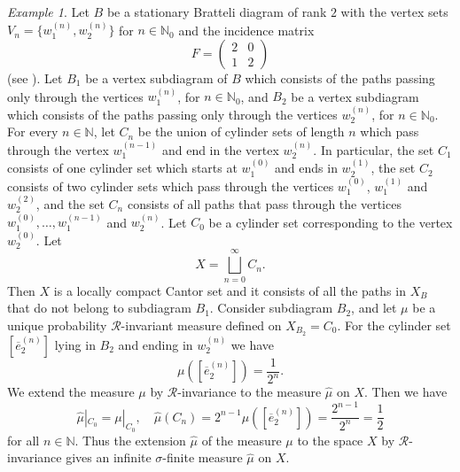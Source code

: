 \documentclass[11pt,reqno]{amsart}
\theoremstyle{definition}
\theoremstyle{remark}
\newtheorem{example}[definition]{Example}
\theoremstyle{plain}
\def\ov{\overline}
\def\wh{\widehat}
\newcommand{\N}{\mathbb N}
\numberwithin{equation}{section}
\begin{document}
\begin{example}\label{example_measure_convergence_BD_inf} Let $B$ be a stationary Bratteli diagram of rank $2$ with the vertex sets $V_n = \{w_1^{(n)}, w_2^{(n)}\}$ for $n \in \N_0$ and the incidence matrix
$$
F = \begin{pmatrix}
2 & 0\\
1 & 2
\end{pmatrix}
$$
(see ). Let $B_1$ be a vertex subdiagram of $B$ which consists of the paths passing only through the vertices $w_1^{(n)}$, for $n \in \N_0$, and $B_2$ be a vertex subdiagram which consists of the paths passing only through the vertices $w_2^{(n)}$, for $n \in \N_0$.
For every $n \in \mathbb{N}$, let $C_n$ be the union of cylinder sets of length $n$ which pass through the vertex $w_1^{(n-1)}$ and end in the vertex $w_2^{(n)}$. 
In particular, the set $C_1$ consists of one cylinder set which starts at $w_1^{(0)}$ and ends in $w_2^{(1)}$, the set $C_2$ consists of two cylinder sets which pass through the vertices $w_1^{(0)}$, $w_1^{(1)}$ and $w_2^{(2)}$, and the set $C_n$ consists of all paths that pass through the vertices $w_1^{(0)}, \ldots, w_1^{(n-1)}$ and $w_2^{(n)}$.
Let $C_0$ be a cylinder set corresponding to the vertex $w_2^{(0)}$.   Let 
$$
X = \bigsqcup_{n = 0}^{\infty} C_n.
$$
Then $X$ is a locally compact Cantor set and it consists of all the paths in $X_B$ that do not belong to subdiagram $B_1$. Consider subdiagram $B_2$, and let $\mu$ be a unique probability $\mathcal{R}$-invariant measure defined on $X_{B_2} = C_0$. For the cylinder set $[\ov e^{(n)}_2]$ lying in $B_2$ and ending in $w_2^{(n)}$ we have
$$
\mu([\ov e^{(n)}_2]) = \frac{1}{2^{n}}.
$$
We extend the measure $\mu$ by $\mathcal{R}$-invariance to the measure $\wh{\mu}$ on $X$. Then we have
$$
\wh {\mu}|_{C_0} = {\mu}|_{C_0}, \quad
\wh {\mu} (C_n) = 2^{n-1} \mu ([\ov e^{(n)}_2]) = \frac{2^{n-1}}{2^{n}} = \frac{1}{2}
$$
for all $n \in \mathbb{N}$. Thus the extension $\wh {\mu}$ of the measure $\mu$ to the space $X$ by $\mathcal{R}$-invariance gives an infinite $\sigma$-finite measure $\wh {\mu}$ on $X$. 


\end{example}
\end{document}
